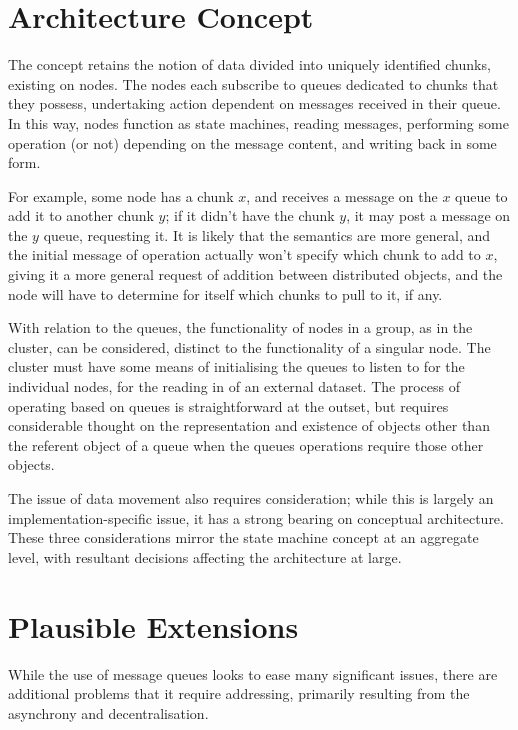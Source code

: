 \documentclass[a4paper,10pt]{article}
\begin{document}
\section{Architecture Concept}
The concept retains the notion of data divided into uniquely identified chunks,
existing on nodes.
The nodes each subscribe to queues dedicated to chunks that they possess,
undertaking action dependent on messages received in their queue.
In this way, nodes function as state machines, reading messages, performing
some operation (or not) depending on the message content, and writing back in
some form.

For example, some node has a chunk \(x\), and receives a message on the \(x\)
queue to add it to another chunk \(y\); if it didn't have the chunk \(y\), it
may post a message on the \(y\) queue, requesting it.
It is likely that the semantics are more general, and the initial message of
operation actually won't specify which chunk to add to \(x\), giving it a more
general request of addition between distributed objects, and the node will have
to determine for itself which chunks to pull to it, if any.

With relation to the queues, the functionality of nodes in a group, as in the
cluster, can be considered, distinct to the functionality of a singular node.
The cluster must have some means of initialising the queues to listen to for
the individual nodes, for the reading in of an external dataset.
The process of operating based on queues is straightforward at the outset, but
requires considerable thought on the representation and existence of objects
other than the referent object of a queue when the queues operations require
those other objects.

The issue of data movement also requires consideration; while this is largely
an implementation-specific issue, it has a strong bearing on conceptual
architecture.
These three considerations mirror the state machine concept at an aggregate
level, with resultant decisions affecting the architecture at large.

\section{Plausible Extensions}

While the use of message queues looks to ease many significant issues, there
are additional problems that it require addressing, primarily resulting from
the asynchrony and decentralisation.
\end{document}
